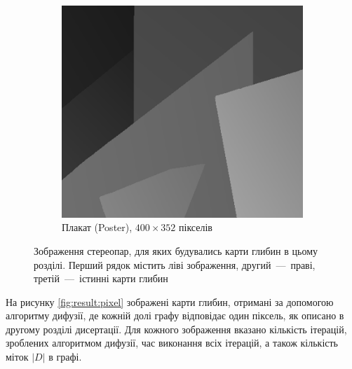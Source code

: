 \begin{figure}[h]
\begin{subfigure}[t]{0.32\textwidth}
    \end{subfigure}
    \hfill
    \begin{subfigure}[t]{0.32\textwidth}
        \centering
        \includegraphics[width=\textwidth]{images/poster_ground_truth}
        \caption{Плакат (Poster), $400 \times 352$ пікселів}
    \end{subfigure}
    \caption{Зображення стереопар,
             для яких будувались карти глибин в цьому розділі.
             Перший рядок містить ліві зображення, другий~---~праві,
             третій~---~істинні карти глибин}
    \label{fig:stereopair}
\end{figure}

На рисунку \ref{fig:result:pixel} зображені карти глибин,
отримані за допомогою алгоритму дифузії,
де кожній долі графу відповідає один піксель,
як описано в другому розділі дисертації.
Для кожного зображення вказано кількість ітерацій, зроблених алгоритмом дифузії,
час виконання всіх ітерацій, а також кількість міток $\left| D \right|$ в графі.

